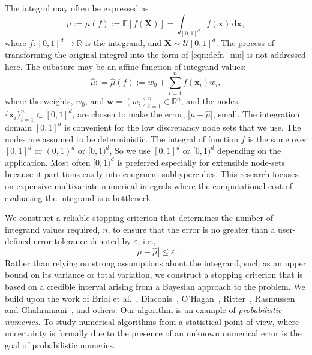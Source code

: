 \documentclass{iitthesis}          %
\newcommand{\bm}[1]{\boldsymbol{#1}}
\newcommand{\dif}[1]{\text{d}{#1}}
\newcommand{\reals}{\mathbb{R}}
\newcommand{\Ex}{\mathbb{E}}
\newcommand{\vw}{\bm{w}}
\newcommand{\vx}{\bm{x}}
\newcommand{\dvx}{\dif{\bm{x}}}
\newcommand{\hmu}{\widehat{\mu}}
\newcommand{\errtol}{\varepsilon}
\def\abs#1{\ensuremath{\left \lvert #1 \right \rvert}}
\begin{document}
The integral may often be expressed as
\begin{equation}
\label{eqn:defn_mu}
\mu:= \mu(f) := \Ex[f(\boldsymbol{X})] = \int_{[0,1]^d} f(\vx)\, \dvx, 
\end{equation}
where $f:[0,1]^d \to \reals$ is the integrand, and $\boldsymbol{X} \sim \mathcal{U}[0,1]^d$.  The process of transforming the original integral into the form of \eqref{eqn:defn_mu}  is not addressed here.  The cubature may be an affine function of integrand values:
\begin{equation}
\label{eqn:defn_hmu}  %
\hmu: = \hmu(f) := w_0 + \sum_{i=1}^{n} f(\vx_i) w_i,
\end{equation}
where the weights, $w_0$, and  $\vw = (w_i)_{i=1}^n \in \reals^n$, and the nodes, $\{\vx_i\}_{i=1}^n \subset [0,1]^d$, are chosen to make the error, $\abs{\mu - \hmu}$, small. The integration domain $[0,1]^d$ is convenient for the low discrepancy node sets that we use.  The nodes are assumed to be deterministic.
The integral of function $f$ is the same over $[0, 1]^d$ or $(0, 1)^d$ or $[0, 1)^d$, So we use $[0, 1]^d$ or $[0, 1)^d$ depending on the application. Most often $[0, 1)^d$ is preferred especially for extensible node-sets because  it partitions easily into congruent subhypercubes.
This research focuses on expensive multivariate numerical integrals 
where the computational cost of evaluating the integrand is a  bottleneck.


We construct a reliable stopping criterion that determines the number of integrand values required, $n$, to ensure that the error is no greater than a user-defined error tolerance denoted by $\varepsilon$, i.e., 
\begin{equation}
\label{eqn:err_crit} 
\abs{\mu - \hmu} \leq \errtol .
\end{equation}
Rather than relying on strong assumptions about the integrand, such as an upper bound on its variance or total variation, we construct a stopping criterion that is based on a credible interval arising from a Bayesian approach to the problem.  We build upon the work of Briol et al.~\cite{BriEtal18a}, Diaconis~\cite{Dia88a}, O'Hagan~\cite{OHa91a}, Ritter~\cite{Rit00a}, Rasmussen and Ghahramani~\cite{RasGha03a}, and others.  Our algorithm is an example of \emph{probabilistic numerics}.
To study numerical algorithms from a statistical point of view, where uncertainty is formally due to the presence of an unknown numerical error is the goal of probabilistic numerics.
\end{document}
